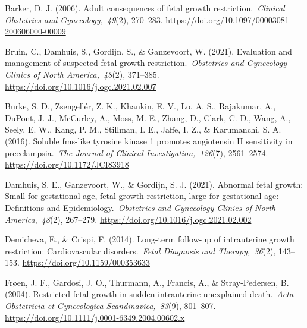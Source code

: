 \documentclass[authordate, reflection]{jote-new-article}
\begin{document}
	Barker, D. J. (2006). Adult consequences of fetal growth restriction. \emph{Clinical Obstetrics and Gynecology, 49}(2), 270--283. \url{https://doi.org/10.1097/00003081-200606000-00009}







	Bruin, C., Damhuis, S., Gordijn, S., \& Ganzevoort, W. (2021). Evaluation and management of suspected fetal growth restriction. \emph{Obstetrics and Gynecology Clinics of North America, 48}(2), 371--385. \url{https://doi.org/10.1016/j.ogc.2021.02.007}







	Burke, S. D., Zsengellér, Z. K., Khankin, E. V., Lo, A. S., Rajakumar, A., DuPont, J. J., McCurley, A., Moss, M. E., Zhang, D., Clark, C. D., Wang, A., Seely, E. W., Kang, P. M., Stillman, I. E., Jaffe, I. Z., \& Karumanchi, S. A. (2016). Soluble fms-like tyrosine kinase 1 promotes angiotensin II sensitivity in preeclampsia. \emph{The Journal of Clinical Investigation, 126}(7), 2561--2574. \url{https://doi.org/10.1172/JCI83918}







	Damhuis, S. E., Ganzevoort, W., \& Gordijn, S. J. (2021). Abnormal fetal growth: Small for gestational age, fetal growth restriction, large for gestational age: Definitions and Epidemiology. \emph{Obstetrics and Gynecology Clinics of North America}, \emph{48}(2), 267--279. \url{https://doi.org/10.1016/j.ogc.2021.02.002}







	Demicheva, E., \& Crispi, F. (2014). Long-term follow-up of intrauterine growth restriction: Cardiovascular disorders. \emph{Fetal Diagnosis and Therapy, 36}(2), 143--153. \url{https://doi.org/10.1159/000353633}







	Frøen, J. F., Gardosi, J. O., Thurmann, A., Francis, A., \& Stray-Pedersen, B. (2004). Restricted fetal growth in sudden intrauterine unexplained death. \emph{Acta Obstetricia et Gynecologica Scandinavica, 83}(9), 801--807. \url{https://doi.org/10.1111/j.0001-6349.2004.00602.x}
\end{document}
